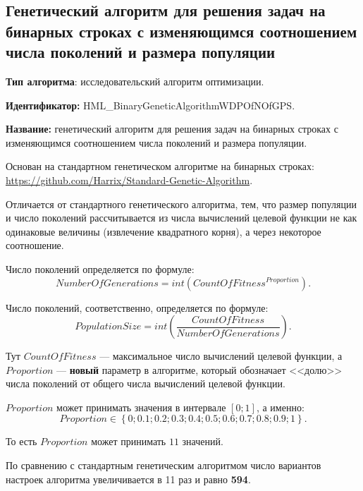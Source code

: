 \subsection{Генетический алгоритм для решения задач на бинарных строках с изменяющимся соотношением числа поколений и размера популяции}\label{HarrixOptimizationAlgorithms:HML_BinaryGeneticAlgorithmWDPOfNOfGPS}

\textbf{Тип алгоритма}: исследовательский алгоритм оптимизации.

\textbf{Идентификатор:} HML\_BinaryGeneticAlgorithmWDPOfNOfGPS.

\textbf{Название:} генетический алгоритм для решения задач на бинарных строках с изменяющимся соотношением числа поколений и размера популяции.

Основан на стандартном генетическом алгоритме на бинарных строках:  \href{https://github.com/Harrix/Standard-Genetic-Algorithm}{https://github.com/Harrix/Standard-Genetic-Algorithm}. 

Отличается от стандартного генетического алгоритма, тем, что размер популяции и число поколений рассчитывается из числа вычислений целевой функции не как одинаковые величины (извлечение квадратного корня), а через некоторое соотношение.

Число поколений определяется по формуле:
\begin{equation}
NumberOfGenerations = int \left( CountOfFitness^{Proportion}\right).
\end{equation}

Число поколений, соответственно, определяется по формуле:
\begin{equation}
PopulationSize = int \left( \dfrac{CountOfFitness}{NumberOfGenerations}\right).
\end{equation}


Тут $CountOfFitness$ --- максимальное число вычислений целевой функции, а $Proportion$ --- \textbf{новый} параметр в алгоритме, который обозначает <<долю>> числа поколений от общего числа вычислений целевой функции.

$Proportion$ может принимать значения в интервале $ [0;1] $, а именно:
\begin{equation}
Proportion \in \left\lbrace 0; 0.1; 0.2; 0.3; 0.4; 0.5; 0.6; 0.7; 0.8; 0.9; 1\right\rbrace .
\end{equation}

То есть $Proportion$ может принимать $ 11 $ значений.

По сравнению с стандартным генетическим алгоритмом число вариантов настроек алгоритма увеличивается в 11 раз и равно \textbf{594}.

